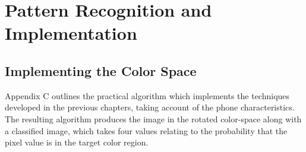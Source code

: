 \chapter{Pattern Recognition and Implementation}


\ifpdf
    \graphicspath{{Chapter4/Figs/Raster/}{Chapter4/Figs/PDF/}{Chapter4/Figs/}}
\else
    \graphicspath{{Chapter4/Figs/Vector/}{Chapter4/Figs/}}
\fi


\section{Implementing the Color Space}\label{sec:ImplementingTheColorSpace}

Appendix C outlines the practical algorithm which implements the techniques developed in the previous chapters, taking account of the phone characteristics. 
The resulting algorithm produces the image in the rotated color-space along with a classified image, which takes four values relating to the probability that the pixel value is in the target color region.  

%
%
%

